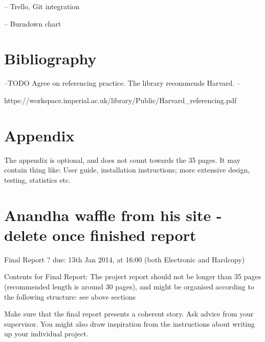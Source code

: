 \documentclass[a4paper, 11pt]{article}
\begin{document}
    -- Trello, Git integration

    -- Burndown chart


\section{Bibliography}
  \printbibliography

  --TODO Agree on referencing practice. The library recommends Harvard. --

  https://workspace.imperial.ac.uk/library/Public/Harvard\_referencing.pdf

\section{Appendix}
  The appendix is optional, and does not count towards the 35 pages. It may
  contain thing like: User guide, installation instructions; more extensive
  design, testing, statistics etc.


\section{Anandha waffle from his site - delete once finished report}
  Final Report ? due: 13th Jan 2014, at 16:00 (both Electronic and Hardcopy)

  Contents for Final Report: The project report should not be longer than 35
  pages (recommended length is around 30 pages), and might be organised
  according to the following structure: see above sections

  Make sure that the final report presents a coherent story. Ask advice from
  your supervisor. You might also draw inspiration from the instructions about
  writing up your individual project.
\end{document}

